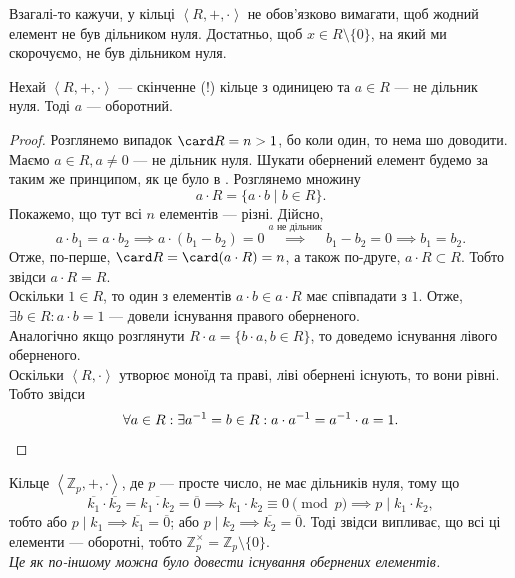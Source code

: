 \documentclass{math_library}
\begin{document}
\begin{remark}
Взагалі-то кажучи, у кільці $\left<R, +, \cdot\right>$ не обов'язково вимагати, щоб жодний елемент не був дільником нуля. Достатньо, щоб $x \in R \setminus \{0\}$, на який ми скорочуємо, не був дільником нуля.
\end{remark}

\begin{theorem}
\label{in_finite_ring_non_zero_divisors_are_inverses}
Нехай $\left<R,+,\cdot \right>$ --- скінченне (!) кільце з одиницею та $a \in R$ --- не дільник нуля. Тоді $a$ --- оборотний.
\end{theorem}

\begin{proof}
Розглянемо випадок $\card R = n > 1$, бо коли один, то нема шо доводити.\\
Маємо $a \in R, a \neq 0$ --- не дільник нуля. Шукати обернений елемент будемо за таким же принципом, як це було в . Розглянемо множину 
\[
a \cdot R = \{a \cdot b \mid b \in R\}.
\]
Покажемо, що тут всі $n$ елементів --- різні. Дійсно,
\[
a \cdot b_1 = a \cdot b_2 \implies a \cdot (b_1-b_2) = 0 \overset{a \text{ не дільник}}{\implies} b_1-b_2 = 0 \implies b_1 = b_2.
\]
Отже, по-перше, $\card R = \card(a \cdot R) = n$, а також по-друге, $a \cdot R \subset R$. Тобто звідси $a \cdot R = R$.\\
Оскільки $1 \in R$, то один з елементів $a \cdot b \in a \cdot R$ має співпадати з $1$. Отже, $\exists b \in R: a \cdot b = 1$ --- довели існування правого оберненого.\\
Аналогічно якщо розглянути $R \cdot a = \{b \cdot a, b \in R \}$, то доведемо існування лівого оберненого.\\
Оскільки $\left<R, \cdot \right>$ утворює моноїд та праві, ліві обернені існують, то вони рівні. Тобто звідси
\[
\forall a \in R: \exists a^{-1} = b \in R: a \cdot a^{-1} = a^{-1} \cdot a = 1. \qedhere
\]
\end{proof}

\begin{example}
Кільце $\left<\mathbb{Z}_p, +, \cdot \right>$, де $p$ --- просте число, не має дільників нуля, тому що
\[
\overline{k_1} \cdot \overline{k_2} = \overline{k_1 \cdot k_2} = \overline{0} \implies k_1 \cdot k_2 \equiv 0 \pmod p \implies p \mid k_1 \cdot k_2,
\]
тобто або $p \mid k_1 \implies \overline{k_1} = \overline{0}$; або $p \mid k_2 \implies \overline{k_2} = \overline{0}$. Тоді звідси випливає, що всі ці елементи --- оборотні, тобто $\mathbb{Z}_p^\times = \mathbb{Z}_p \setminus \{0\}$.\\
\textit{Це як по-іншому можна було довести існування обернених елементів.}
\end{example}
\end{document}
